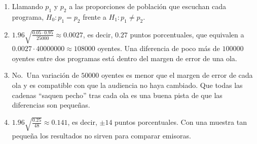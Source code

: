\documentclass[
  spanish,
  a4paper,
]{scrreport}
\theoremstyle{definition}
\theoremstyle{remark}
\begin{document}
\begin{tcolorbox}[enhanced jigsaw, arc=.35mm, bottomrule=.15mm, bottomtitle=1mm, breakable, colback=white, colbacktitle=quarto-callout-tip-color!10!white, colframe=quarto-callout-tip-color-frame, coltitle=black, left=2mm, leftrule=.75mm, opacityback=0, opacitybacktitle=0.6, rightrule=.15mm, title=\textcolor{quarto-callout-tip-color}{\faLightbulb}\hspace{0.5em}{Solución}, titlerule=0mm, toprule=.15mm, toptitle=1mm]

\begin{enumerate}
\def\labelenumi{\alph{enumi}.}
\item
  Llamando \(p_1\) y \(p_2\) a las proporciones de población que
  escuchan cada programa, \(H_0: p_1=p_2\) frente a
  \(H_1: p_1\neq p_2\).
\item
  \(1.96\sqrt{\frac{0.05\cdot 0.95}{25000}}\approx 0.0027\), es decir,
  \(0.27\) puntos porcentuales, que equivalen a
  \(0.0027\cdot 40000000\approx 108000\) oyentes. Una diferencia de poco
  más de \(100000\) oyentes entre dos programas está dentro del margen
  de error de una ola.
\item
  No.~Una variación de \(50000\) oyentes es menor que el margen de error
  de cada ola y es compatible con que la audiencia no haya cambiado. Que
  todas las cadenas ``saquen pecho'' tras cada ola es una buena pista de
  que las diferencias son pequeñas.
\item
  \(1.96\sqrt{\frac{0.25}{48}}\approx 0.141\), es decir, \(\pm 14\)
  puntos porcentuales. Con una muestra tan pequeña los resultados no
  sirven para comparar emisoras.
\end{enumerate}

\end{tcolorbox}
\end{document}
